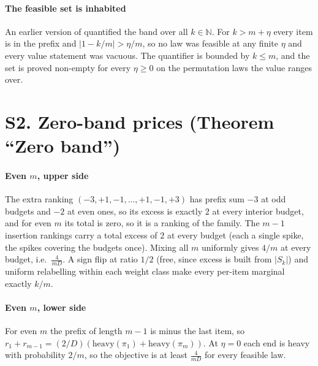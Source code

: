 
\paragraph{The feasible set is inhabited} An earlier version of 
quantified the band over all $k\in\mathbb{N}$. For $k>m+\eta$ every item is in the
prefix and $|1-k/m|>\eta/m$, so no law was feasible at any finite $\eta$ and every value
statement was vacuous. The quantifier
is bounded by $k\le m$, and the set is proved non-empty for every $\eta\ge0$ on the
permutation laws the value ranges over.


\section{S2. Zero-band prices (Theorem ``Zero band'')}

\paragraph{Even $m$, upper side} The extra ranking $(-3,+1,-1,\dots,+1,-1,+3)$ has prefix
sum $-3$ at odd budgets and $-2$ at even ones, so its excess is exactly $2$ at every
interior budget, and for even $m$ its total is zero, so it is a ranking of the family. The
$m-1$ insertion rankings carry a total excess of $2$ at every budget (each a single spike,
the spikes covering the budgets once). Mixing all $m$ uniformly gives $4/m$ at every
budget, i.e.\ $\frac{4}{mD}$. A sign flip at ratio $1/2$ (free, since excess is built from
$|S_{k}|$) and uniform relabelling within each weight class make every per-item marginal
exactly $k/m$.


\paragraph{Even $m$, lower side} For even $m$ the prefix of length $m-1$ is minus the last
item, so $r_{1}+r_{m-1}=(2/D)(\mathrm{heavy}(\pi_{1})+\mathrm{heavy}(\pi_{m}))$. At $\eta=0$
each end is heavy with probability $2/m$, so the objective is at least $\frac{4}{mD}$ for every
feasible law.

